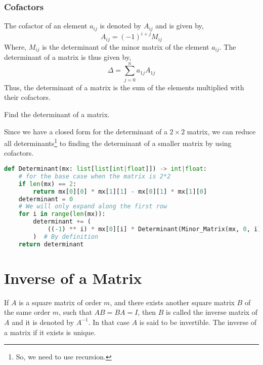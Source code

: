 \subsubsection{Cofactors}
The cofactor of an element $a_{ij}$ is denoted by $A_{ij}$ and is given by,
\[A_{ij}=(-1)^{i+j}M_{ij}\]
Where, $M_{ij}$ is the determinant of the minor matrix of the element $a_{ij}$.
The determinant of a matrix is thus given by,
\[\Delta=\sum\limits_{j=0}^n a_{1j}A_{1j}\]
Thus, the determinant of a matrix is the sum of the elements multiplied with their cofactors.
\begin{eg}
	Find the determinant of a matrix.
\end{eg}
\begin{explanation}
	Since we have a closed form for the determinant of a $2\times 2$ matrix, we can reduce all determinants\footnote{So, we need to use recursion.} to finding the determinant of a smaller matrix by using cofactors.
	\begin{lstlisting}[language=Python, numbers=none]
def Determinant(mx: list[list[int|float]]) -> int|float:
	# for the base case when the matrix is 2*2
	if len(mx) == 2:
		return mx[0][0] * mx[1][1] - mx[0][1] * mx[1][0]
	determinant = 0
	# We will only expand along the first row
	for i in range(len(mx)):
		determinant += (
			((-1) ** i) * mx[0][i] * Determinant(Minor_Matrix(mx, 0, i))
		)  # By definition
	return determinant \end{lstlisting}
\end{explanation}
\section{Inverse of a Matrix}
If $A$ is a square matrix of order $m$, and there exists another square matrix $B$ of the same order $m$, such that $AB=BA=I$, then $B$ is called the inverse matrix of $A$ and it is denoted by $A^{-1}$. In that case $A$ is said to be invertible. The inverse of a matrix if it exists is unique.\
